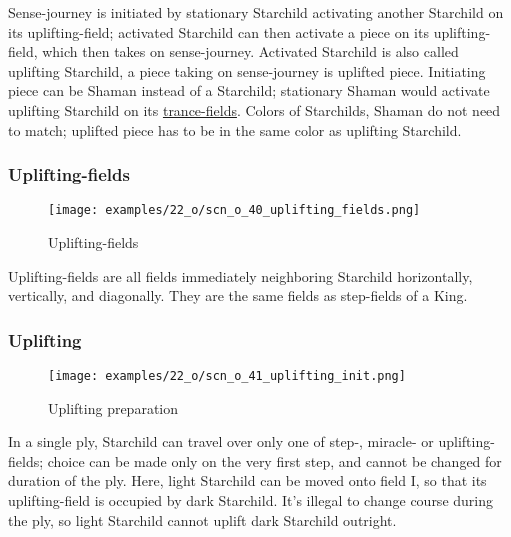 \vspace*{-0.7\baselineskip}
Sense-journey is initiated by stationary Starchild activating another Starchild
on its uplifting-field; activated Starchild can then activate a piece on its
uplifting-field, which then takes on sense-journey. Activated Starchild is also
called uplifting Starchild, a piece taking on sense-journey is uplifted piece.
Initiating piece can be Shaman instead of a Starchild; stationary Shaman would
activate uplifting Starchild on its
\hyperref[fig:scn_cot_070_trance_fields]{trance-fields}. Colors of Starchilds,
Shaman do not need to match; uplifted piece has to be in the same color as
uplifting Starchild.

\vspace*{-0.9\baselineskip}
\subsubsection*{Uplifting-fields}
\label{sec:One/Starchild/Sense-journey/Uplifting-fields}

\vspace*{-0.9\baselineskip}
\noindent
\begin{wrapfigure}[5]{l}{0.4\textwidth}
\centering
\texttt{[image: examples/22\_o/scn\_o\_40\_uplifting\_fields.png]}
\vspace*{-0.4\baselineskip}
\caption{Uplifting-fields}
\label{fig:scn_o_40_uplifting_fields}
\end{wrapfigure}
Uplifting-fields are all fields immediately neighboring Starchild horizontally,
vertically, and diagonally. They are the same fields as step-fields of a King.

\vspace*{1.3\baselineskip}

\subsubsection*{Uplifting}
\label{sec:One/Starchild/Sense-journey/Uplifting}

\vspace*{-0.9\baselineskip}
\noindent
\begin{wrapfigure}[9]{l}{0.4\textwidth}
\centering
\texttt{[image: examples/22\_o/scn\_o\_41\_uplifting\_init.png]}
\vspace*{-0.4\baselineskip}
\caption{Uplifting preparation}
\label{fig:scn_o_41_uplifting_init}
\end{wrapfigure}
In a single ply, Starchild can travel over only one of step-, miracle- or uplifting-fields;
choice can be made only on the very first step, and cannot be changed for duration of the
ply.\newline
\indent
Here, light Starchild can be moved onto field I, so that its uplifting-field is occupied
by dark Starchild. It's illegal to change course during the ply, so light Starchild cannot
uplift dark Starchild outright.

